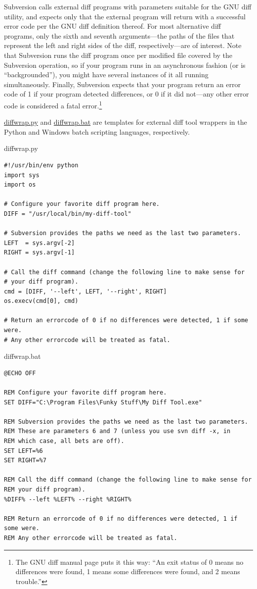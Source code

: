 Subversion calls external diff programs with parameters suitable for the
GNU diff utility, and expects only that the external program will return
with a successful error code per the GNU diff definition thereof. For
most alternative diff programs, only the sixth and seventh
arguments---the paths of the files that represent the left and right
sides of the diff, respectively---are of interest. Note that Subversion
runs the diff program once per modified file covered by the Subversion
operation, so if your program runs in an asynchronous fashion (or is
``backgrounded''), you might have several instances of it all running
simultaneously. Finally, Subversion expects that your program return an
error code of 1 if your program detected differences, or 0 if it did
not---any other error code is considered a fatal error.\footnote{The GNU
  diff manual page puts it this way: ``An exit status of 0 means no
  differences were found, 1 means some differences were found, and 2
  means trouble.''}

\hyperref[svn.advanced.externaldifftools.diff.ex-1]{diffwrap.py} and
\hyperref[svn.advanced.externaldifftools.diff.ex-2]{diffwrap.bat} are
templates for external diff tool wrappers in the Python and Windows
batch scripting languages, respectively.

\protect{}\label{svn.advanced.externaldifftools.diff.ex-1}
diffwrap.py

\begin{verbatim}
#!/usr/bin/env python
import sys
import os

# Configure your favorite diff program here.
DIFF = "/usr/local/bin/my-diff-tool"

# Subversion provides the paths we need as the last two parameters.
LEFT  = sys.argv[-2]
RIGHT = sys.argv[-1]

# Call the diff command (change the following line to make sense for
# your diff program).
cmd = [DIFF, '--left', LEFT, '--right', RIGHT]
os.execv(cmd[0], cmd)

# Return an errorcode of 0 if no differences were detected, 1 if some were.
# Any other errorcode will be treated as fatal.
\end{verbatim}

\protect{}\label{svn.advanced.externaldifftools.diff.ex-2}
diffwrap.bat

\begin{verbatim}
@ECHO OFF

REM Configure your favorite diff program here.
SET DIFF="C:\Program Files\Funky Stuff\My Diff Tool.exe"

REM Subversion provides the paths we need as the last two parameters.
REM These are parameters 6 and 7 (unless you use svn diff -x, in
REM which case, all bets are off).
SET LEFT=%6
SET RIGHT=%7

REM Call the diff command (change the following line to make sense for
REM your diff program).
%DIFF% --left %LEFT% --right %RIGHT%

REM Return an errorcode of 0 if no differences were detected, 1 if some were.
REM Any other errorcode will be treated as fatal.
\end{verbatim}

